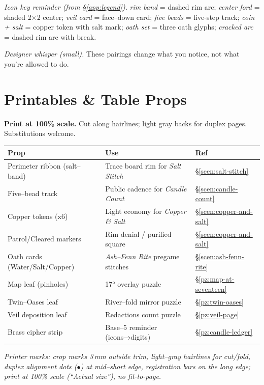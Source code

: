 \documentclass[11pt]{article}
\begin{document}
\begin{itemize}
\medskip
\noindent\textit{Icon key reminder (from \S\ref{app:legend}).} \textit{rim band} = dashed rim arc; \textit{center ford} = shaded 2×2 center; \textit{veil card} = face–down card; \textit{five beads} = five-step track; \textit{coin + salt} = copper token with salt mark; \textit{oath set} = three oath glyphs; \textit{cracked arc} = dashed rim arc with break.

\medskip
\noindent\textit{Designer whisper (small).} These pairings change what you notice, not what you’re allowed to do.

\clearpage
\section{Printables \& Table Props}
\label{app:printables}

\noindent\textbf{Print at 100\% scale.} Cut along hairlines; light gray backs for duplex pages. Substitutions welcome.

\medskip
\begin{tabular}{p{5.2cm} p{5.6cm} p{3.7cm}}
\toprule
\textbf{Prop} & \textbf{Use} & \textbf{Ref}\\
\midrule
Perimeter ribbon (salt–band) & Trace board rim for \emph{Salt Stitch} & \S\ref{scen:salt-stitch}\\
Five–bead track & Public cadence for \emph{Candle Count} & \S\ref{scen:candle-count}\\
Copper tokens (x6) & Light economy for \emph{Copper \& Salt} & \S\ref{scen:copper-and-salt}\\
Patrol/Cleared markers & Rim denial / purified square & \S\ref{scen:copper-and-salt}\\
Oath cards (Water/Salt/Copper) & \emph{Ash–Fenn Rite} pregame stitches & \S\ref{scen:ash-fenn-rite}\\
Map leaf (pinholes) & 17° overlay puzzle & \S\ref{pz:map-at-seventeen}\\
Twin–Oases leaf & River–fold mirror puzzle & \S\ref{pz:twin-oases}\\
Veil deposition leaf & Redactions count puzzle & \S\ref{pz:veil-page}\\
Brass cipher strip & Base–5 reminder (icons→digits) & \S\ref{pz:candle-ledger}\\
\bottomrule
\end{tabular}
\medskip
\noindent\textit{Printer marks: crop marks 3\,mm outside trim, light–gray hairlines for cut/fold, duplex alignment dots (\(\bullet\)) at mid–short edge, registration bars on the long edge; print at 100\% scale (“Actual size”), no fit-to-page.}


\end{itemize}
\end{document}

